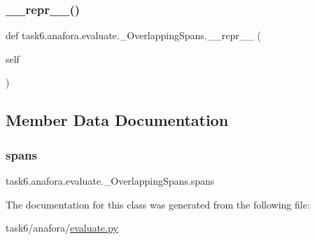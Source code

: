\subsubsection{\texorpdfstring{\+\_\+\+\_\+repr\+\_\+\+\_\+()}{\_\_repr\_\_()}}
{\footnotesize\ttfamily def task6.\+anafora.\+evaluate.\+\_\+\+Overlapping\+Spans.\+\_\+\+\_\+repr\+\_\+\+\_\+ (\begin{DoxyParamCaption}\item[{}]{self }\end{DoxyParamCaption})}



\subsection{Member Data Documentation}
\mbox{\label{classtask6_1_1anafora_1_1evaluate_1_1__OverlappingSpans_a35ea422300c32266ef7c6933b17c45bb}} 
\subsubsection{\texorpdfstring{spans}{spans}}
{\footnotesize\ttfamily task6.\+anafora.\+evaluate.\+\_\+\+Overlapping\+Spans.\+spans}



The documentation for this class was generated from the following file\+:\begin{DoxyCompactItemize}
\item 
task6/anafora/\hyperlink{evaluate_8py}{evaluate.\+py}\end{DoxyCompactItemize}
